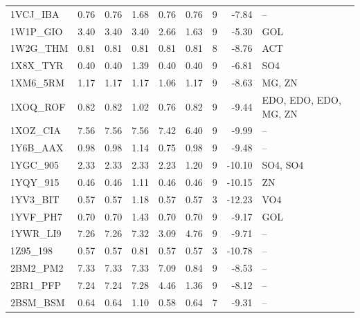 \begin{longtable}{lrrrrrrrp{2.6cm}}
1VCJ\_IBA & 0.76 & 0.76 & 1.68 & 0.76 & 0.76 & 9 & -7.84 & -- \\
1W1P\_GIO & 3.40 & 3.40 & 3.40 & 2.66 & 1.63 & 9 & -5.30 & GOL \\
1W2G\_THM & 0.81 & 0.81 & 0.81 & 0.81 & 0.81 & 8 & -8.76 & ACT \\
1X8X\_TYR & 0.40 & 0.40 & 1.39 & 0.40 & 0.40 & 9 & -6.81 & SO4 \\
1XM6\_5RM & 1.17 & 1.17 & 1.17 & 1.06 & 1.17 & 9 & -8.63 & MG, ZN \\
1XOQ\_ROF & 0.82 & 0.82 & 1.02 & 0.76 & 0.82 & 9 & -9.44 & EDO, EDO, EDO, MG, ZN \\
1XOZ\_CIA & 7.56 & 7.56 & 7.56 & 7.42 & 6.40 & 9 & -9.99 & -- \\
1Y6B\_AAX & 0.98 & 0.98 & 1.14 & 0.75 & 0.98 & 9 & -9.48 & -- \\
1YGC\_905 & 2.33 & 2.33 & 2.33 & 2.23 & 1.20 & 9 & -10.10 & SO4, SO4 \\
1YQY\_915 & 0.46 & 0.46 & 1.11 & 0.46 & 0.46 & 9 & -10.15 & ZN \\
1YV3\_BIT & 0.57 & 0.57 & 1.18 & 0.57 & 0.57 & 3 & -12.23 & VO4 \\
1YVF\_PH7 & 0.70 & 0.70 & 1.43 & 0.70 & 0.70 & 9 & -9.17 & GOL \\
1YWR\_LI9 & 7.26 & 7.26 & 7.32 & 3.09 & 4.76 & 9 & -9.71 & -- \\
1Z95\_198 & 0.57 & 0.57 & 0.81 & 0.57 & 0.57 & 3 & -10.78 & -- \\
2BM2\_PM2 & 7.33 & 7.33 & 7.33 & 7.09 & 0.84 & 9 & -8.53 & -- \\
2BR1\_PFP & 7.24 & 7.24 & 7.28 & 4.46 & 1.36 & 9 & -8.12 & -- \\
2BSM\_BSM & 0.64 & 0.64 & 1.10 & 0.58 & 0.64 & 7 & -9.31 & -- \\
\bottomrule
\end{longtable}
